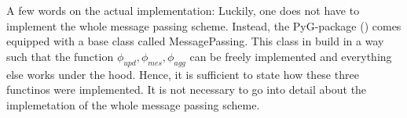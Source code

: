 A few words on the actual implementation: Luckily, one does not have to implement the whole message passing scheme. Instead,
the PyG-package (\cite{PyG}) comes equipped with a base class called MessagePassing. This class in build in a way such that
the function $\phi_{upd},\phi_{mes},\phi_{agg}$ can be freely implemented and everything else works under the hood. 
Hence, it is sufficient to state how these three functinos were implemented. It is not necessary to go into 
detail about the implemetation of the whole message passing scheme.  